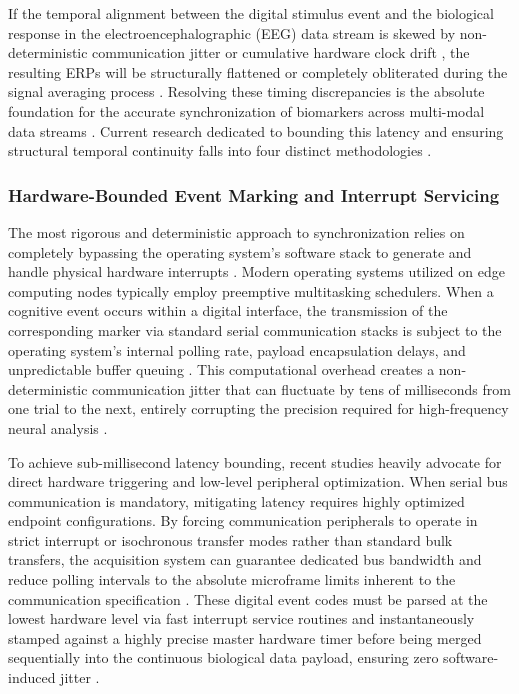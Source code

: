 If the temporal alignment between the digital stimulus event and the biological response in the electroencephalographic (EEG) data stream is skewed by non-deterministic communication jitter or cumulative hardware clock drift \cite{kothe2025lab}, the resulting ERPs will be structurally flattened or completely obliterated during the signal averaging process \cite{molina2024enhanced}. Resolving these timing discrepancies is the absolute foundation for the accurate synchronization of biomarkers across multi-modal data streams \cite{manivannan2025review}. Current research dedicated to bounding this latency and ensuring structural temporal continuity falls into four distinct methodologies \cite{choi2023prefrontal}.

\subsubsection{Hardware-Bounded Event Marking and Interrupt Servicing}

The most rigorous and deterministic approach to synchronization relies on completely bypassing the operating system's software stack to generate and handle physical hardware interrupts \cite{eckhoff2024temporal}. Modern operating systems utilized on edge computing nodes typically employ preemptive multitasking schedulers. When a cognitive event occurs within a digital interface, the transmission of the corresponding marker via standard serial communication stacks is subject to the operating system's internal polling rate, payload encapsulation delays, and unpredictable buffer queuing \cite{miziara2025comparative}. This computational overhead creates a non-deterministic communication jitter that can fluctuate by tens of milliseconds from one trial to the next, entirely corrupting the precision required for high-frequency neural analysis \cite{gemborn2023open}.

To achieve sub-millisecond latency bounding, recent studies heavily advocate for direct hardware triggering and low-level peripheral optimization.  When serial bus communication is mandatory, mitigating latency requires highly optimized endpoint configurations. By forcing communication peripherals to operate in strict interrupt or isochronous transfer modes rather than standard bulk transfers, the acquisition system can guarantee dedicated bus bandwidth and reduce polling intervals to the absolute microframe limits inherent to the communication specification \cite{rousseau2025implementation}. These digital event codes must be parsed at the lowest hardware level via fast interrupt service routines and instantaneously stamped against a highly precise master hardware timer before being merged sequentially into the continuous biological data payload, ensuring zero software-induced jitter \cite{andrijevic2025precision}.

